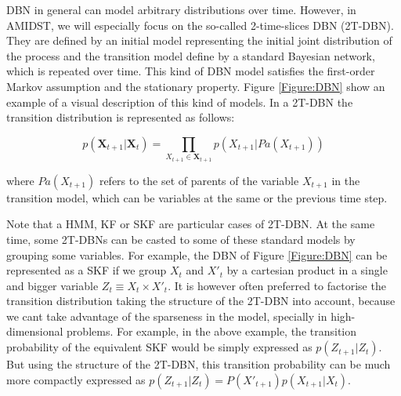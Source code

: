 DBN in general can model arbitrary distributions over time. However, in AMIDST,  we will especially focus on the so-called 2-time-slices DBN (2T-DBN). They are defined by an initial model representing the initial joint distribution of the process and the transition model define by a standard Bayesian network, which is repeated over time.  This kind of DBN model satisfies the first-order Markov assumption and the stationary property. Figure \ref{Figure:DBN} show an example of a visual description of this kind of models. In a 2T-DBN the transition distribution is represented as follows:

$$ p(\bm X_{t+1} | \bm X_t) = \prod_{X_{t+1}\in\bm X_{t+1}} p(X_{t+1}|Pa(X_{t+1}))$$ 

\noindent where $Pa(X_{t+1})$ refers to the set of parents of the variable $X_{t+1}$ in the transition model, which can be variables at the same or the previous time step. 

Note that a HMM, KF or SKF are particular cases of 2T-DBN. At the same time, some 2T-DBNs can be casted to some of these standard models by grouping some variables. For example, the DBN of Figure \ref{Figure:DBN} can be represented as a SKF if we group $X_t$ and $X'_t$ by a cartesian product in a single and bigger variable $Z_t \equiv X_t \times X'_t $. It is however often preferred to factorise the transition distribution taking the structure of the 2T-DBN into account, because we cant take advantage of the sparseness in the model, specially in high-dimensional problems. For example, in the above example,  the transition probability of the equivalent SKF would be simply expressed as $p(Z_{t+1}|Z_t)$. But using the structure of the 2T-DBN, this transition probability can be much more compactly expressed as $p(Z_{t+1}|Z_t)=P(X'_{t+1})p(X_{t+1}|X_t)$.


